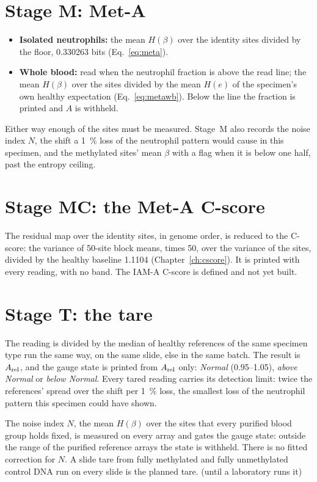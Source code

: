 \section{Stage M: Met-A}

\begin{itemize}
\item \textbf{Isolated neutrophils:} the mean $H(\beta)$ over the identity sites divided by the floor, 0.330263 bits (Eq.~\eqref{eq:meta}).
\item \textbf{Whole blood:} read when the neutrophil fraction is above the read line; the mean $H(\beta)$ over the sites divided by the mean $H(e)$ of the specimen's
      own healthy expectation (Eq.~\eqref{eq:metawb}). Below the line the fraction is printed and $A$ is withheld.
\end{itemize}
Either way enough of the sites must be measured. Stage~M also records the noise index $N$, the shift a 1~\% loss of the neutrophil pattern would cause in
this specimen, and the methylated sites' mean $\beta$ with a flag when it is below one half, past the entropy ceiling.

\section{Stage MC: the Met-A C-score}

The residual map over the identity sites, in genome order, is reduced to the C-score: the variance of 50-site block means, times 50, over the variance of the sites,
divided by the healthy baseline 1.1104 (Chapter~\ref{ch:cscore}). It is printed with every reading, with no band. The IAM-A C-score is defined and not yet built. \openprob

\section{Stage T: the tare}

The reading is divided by the median of healthy references of the same specimen type run the same way, on the same slide, else in the same batch.
The result is $A_{\rm rel}$, and the gauge state is printed from $A_{\rm rel}$ only: \emph{Normal} (0.95--1.05), \emph{above Normal} or \emph{below Normal}. Every
tared reading carries its detection limit: twice the references' spread over the shift per 1~\% loss, the smallest loss of the neutrophil pattern this specimen
could have shown.

The noise index $N$, the mean $H(\beta)$ over the sites that every purified blood group holds fixed, is measured on every array and gates the gauge
state: outside the range of the purified reference arrays the state is withheld.
There is no fitted correction for $N$. \calibrated{} A slide tare from fully methylated and fully unmethylated control DNA run on every slide is the planned tare.
\openprob{} (until a laboratory runs it)

